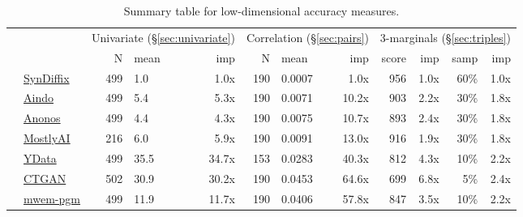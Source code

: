 \begin{table}
    \centering
    \caption{Summary table for low-dimensional accuracy measures.}
    \label{tab:accuracy}
    \begin{tabular}{llrlr@{\hskip 10pt}r@{\hskip 6pt}l@{\hskip 6pt}r@{\hskip 10pt}r@{\hskip 6pt}r@{\hskip 6pt}r@{\hskip 6pt}r}
        \toprule
          &   & \multicolumn{3}{c}{Univariate (\S\ref{sec:univariate})} & \multicolumn{3}{c}{Correlation (\S\ref{sec:pairs})} & \multicolumn{4}{c}{3-marginals (\S\ref{sec:triples})} \\
        
 & & N & mean & imp & N & mean & imp & score & imp & samp & imp \\
\midrule
        \cellcolor{blue} & \href{https://htmlpreview.github.io/?https://github.com/yoid2000/sdnist-summary/blob/main/results/syndiffix_all/report.html}{SynDiffix} & 499 & 1.0 & 1.0x & 190 & 0.0007 & 1.0x & 956 & 1.0x & 60\% & 1.0x \\
        \cellcolor{red} & \href{https://htmlpreview.github.io/?https://github.com/yoid2000/sdnist-summary/blob/main/results/aindo_synth/report.html}{Aindo} & 499 & 5.4 & 5.3x & 190 & 0.0071 & 10.2x & 903 & 2.2x & 30\% & 1.8x \\
        \cellcolor{red} & \href{https://htmlpreview.github.io/?https://github.com/yoid2000/sdnist-summary/blob/main/results/anonos_sdk/report.html}{Anonos} & 499 & 4.4 & 4.3x & 190 & 0.0075 & 10.7x & 893 & 2.4x & 30\% & 1.8x \\
        \cellcolor{red} & \href{https://htmlpreview.github.io/?https://github.com/yoid2000/sdnist-summary/blob/main/results/mostlyai_sd_platform/report.html}{MostlyAI} & 216 & 6.0 & 5.9x & 190 & 0.0091 & 13.0x & 916 & 1.9x & 30\% & 1.8x \\
        \cellcolor{red} & \href{https://htmlpreview.github.io/?https://github.com/yoid2000/sdnist-summary/blob/main/results/ydata_fabric_synthesizers/report.html}{YData} & 499 & 35.5 & 34.7x & 153 & 0.0283 & 40.3x & 812 & 4.3x & 10\% & 2.2x \\
        \cellcolor{red} & \href{https://htmlpreview.github.io/?https://github.com/yoid2000/sdnist-summary/blob/main/results/sdv_ctgan_epochs1000/report.html}{CTGAN} & 502 & 30.9 & 30.2x & 190 & 0.0453 & 64.6x & 699 & 6.8x & 5\% & 2.4x \\
        \cellcolor{ForestGreen} & \href{https://htmlpreview.github.io/?https://github.com/yoid2000/sdnist-summary/blob/main/results/mwem_pgm/report.html}{mwem-pgm} & 499 & 11.9 & 11.7x & 190 & 0.0406 & 57.8x & 847 & 3.5x & 10\% & 2.2x \\

\end{tabular}
\end{table}
